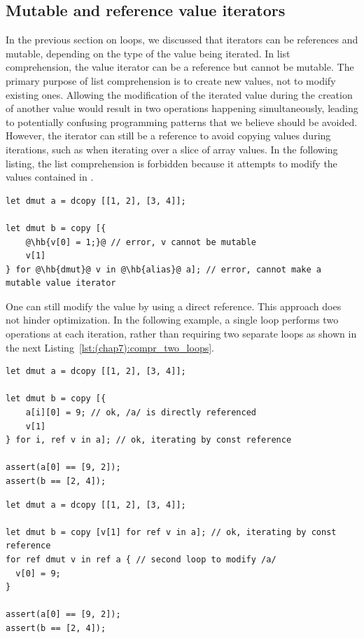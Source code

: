 \subsection{Mutable and reference value iterators}

In the previous section on  loops, we discussed that iterators can be
references and mutable, depending on the type of the value being iterated. In
list comprehension, the value iterator can be a reference but cannot be mutable.
The primary purpose of list comprehension is to create new values, not to modify
existing ones. Allowing the modification of the iterated value during the
creation of another value would result in two operations happening
simultaneously, leading to potentially confusing programming patterns that we
believe should be avoided. However, the iterator can still be a reference to
avoid copying values during iterations, such as when iterating over a slice of
array values. In the following listing, the list comprehension is forbidden
because it attempts to modify the values contained in .

\begin{lstlisting}[style=coloredverbatimError, escapechar=@]
let dmut a = dcopy [[1, 2], [3, 4]];

let dmut b = copy [{
    @\hb{v[0] = 1;}@ // error, v cannot be mutable
    v[1]
} for @\hb{dmut}@ v in @\hb{alias}@ a]; // error, cannot make a mutable value iterator
\end{lstlisting}

One can still modify the value  by using a direct reference. This
approach does not hinder optimization. In the following example, a single loop
performs two operations at each iteration, rather than requiring two separate
loops as shown in the next Listing~\ref{lst:(chap7):compr_two_loops}.

\begin{lstlisting}[style=coloredverbatim, caption=Modify existing value during list comprehension]
let dmut a = dcopy [[1, 2], [3, 4]];

let dmut b = copy [{
    a[i][0] = 9; // ok, /a/ is directly referenced
    v[1]
} for i, ref v in a]; // ok, iterating by const reference

assert(a[0] == [9, 2]);
assert(b == [2, 4]);
\end{lstlisting}

\begin{lstlisting}[style=coloredverbatim, caption=Using two loops, label=lst:(chap7):compr_two_loops]
let dmut a = dcopy [[1, 2], [3, 4]];

let dmut b = copy [v[1] for ref v in a]; // ok, iterating by const reference
for ref dmut v in ref a { // second loop to modify /a/
  v[0] = 9;
}

assert(a[0] == [9, 2]);
assert(b == [2, 4]);
\end{lstlisting}

